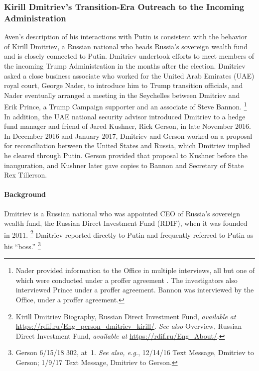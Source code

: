 \subsubsection{Kirill Dmitriev's Transition-Era Outreach to the Incoming Administration}

Aven's description of his interactions with Putin is consistent with the behavior of Kirill Dmitriev, a Russian national who heads Russia's sovereign wealth fund and is closely connected to Putin.
Dmitriev undertook efforts to meet members of the incoming Trump Administration in the months after the election.
Dmitriev asked a close business associate who worked for the United Arab Emirates (UAE) royal court, George Nader, to introduce him to Trump transition officials, and Nader eventually arranged a meeting in the Seychelles between Dmitriev and Erik Prince, a Trump Campaign supporter and an associate of Steve Bannon.%
\footnote{Nader provided information to the Office in multiple interviews, all but one of which were conducted under a proffer agreement .
The investigators also interviewed Prince under a proffer agreement.
Bannon was interviewed by the Office,  under a proffer agreement.}
In addition, the UAE national security advisor introduced Dmitriev to a hedge fund manager and friend of Jared Kushner, Rick Gerson, in late November 2016.
In December 2016 and January 2017, Dmitriev and Gerson worked on a proposal for reconciliation between the United States and Russia, which Dmitriev implied he cleared through Putin.
Gerson provided that proposal to Kushner before the inauguration, and Kushner later gave copies to Bannon and Secretary of State Rex Tillerson.

\paragraph{Background}

Dmitriev is a Russian national who was appointed CEO of Russia's sovereign wealth fund, the Russian Direct Investment Fund (RDIF), when it was founded in 2011.%
\footnote{Kirill Dmitriev Biography, Russian Direct Investment Fund, \textit{available at} \url{https://rdif.ru/Eng\_person\_dmitriev\_kirill/}.
\textit{See also} Overview, Russian Direct Investment Fund, \textit{available at} \url{https://rdif.ru/Eng\_About/}.}
Dmitriev reported directly to Putin and frequently referred to Putin as his ``boss.''%
\footnote{Gerson 6/15/18 302, at~1.
\textit{See also, e.g.}, 12/14/16 Text Message, Dmitriev to Gerson;
1/9/17 Text Message, Dmitriev to Gerson.}

